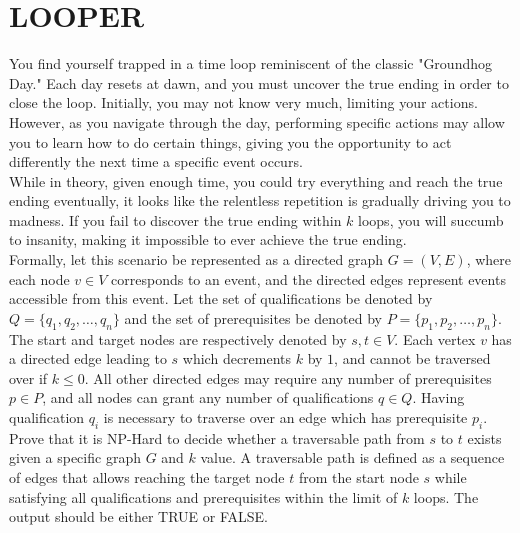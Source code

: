 \documentclass[11pt]{article}
\begin{document}
	\section*{LOOPER}
	You find yourself trapped in a time loop reminiscent of the classic "Groundhog Day." Each day resets at dawn, and you must uncover the true ending in order to close the loop. Initially, you may not know very much, limiting your actions. However, as you navigate through the day, performing specific actions may allow you to learn how to do certain things, giving you the opportunity to act differently the next time a specific event occurs.\\
	
	\noindent
	While in theory, given enough time, you could try everything and reach the true ending eventually, it looks like the relentless repetition is gradually driving you to madness. If you fail to discover the true ending within $k$ loops, you will succumb to insanity, making it impossible to ever achieve the true ending.\\
	
	\noindent
	Formally, let this scenario be represented as a directed graph $G=(V,E)$, where each node $v \in V$ corresponds to an event, and the directed edges represent events accessible from this event. Let the set of qualifications be denoted by $Q= \{q_1, q_2,\ldots,q_n\}$ and the set of prerequisites be denoted by $P=\{p_1, p_2,\ldots,p_n\}$. The start and target nodes are respectively denoted by $s,t\in V$. Each vertex $v$ has a directed edge leading to $s$ which decrements $k$ by $1$, and cannot be traversed over if $k\leq0$. All other directed edges may require any number of prerequisites $p \in P$, and all nodes can grant any number of qualifications $q \in Q$. Having qualification $q_i$ is necessary to traverse over an edge which has prerequisite $p_i$.\\ 
	
	\noindent
	Prove that it is NP-Hard to decide whether a traversable path from $s$ to $t$ exists given a specific graph $G$ and $k$ value. A traversable path is defined as a sequence of edges that allows reaching the target node $t$ from the start node $s$ while satisfying all qualifications and prerequisites within the limit of $k$ loops. The output should be either TRUE or FALSE.
\end{document}
